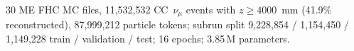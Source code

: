 30 ME FHC MC files, 11{,}532{,}532 CC~$\nu_\mu$ events with $z \ge 4000$~mm (41.9\% reconstructed), 87{,}999{,}212 particle tokens; subrun split 9{,}228{,}854 / 1{,}154{,}450 / 1{,}149{,}228 train / validation / test; 16 epochs; 3.85\,M parameters.
